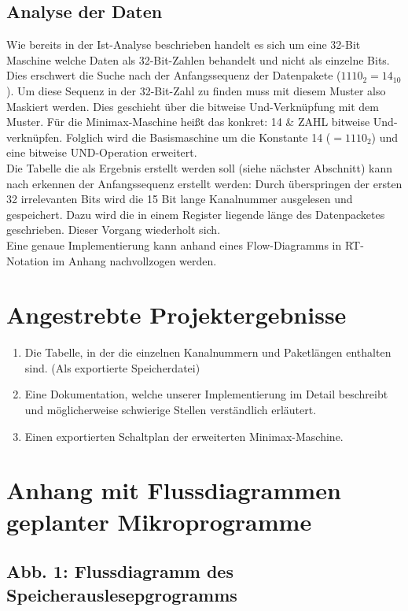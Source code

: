 \documentclass[12pt,titlepage]{article}
\begin{document}
\subsection{Analyse der Daten}


Wie bereits in der Ist-Analyse beschrieben handelt es sich um eine 32-Bit Maschine welche Daten als 32-Bit-Zahlen behandelt und nicht als 
einzelne Bits. Dies erschwert die Suche nach der Anfangssequenz der Datenpakete ($1110_{2} = 14_{10}$). Um diese Sequenz in der 32-Bit-Zahl
zu finden muss mit diesem Muster also Maskiert werden. Dies geschieht {\"u}ber die bitweise Und-Verkn{\"u}pfung mit dem Muster. F{\"u}r die Minimax-Maschine
heißt das konkret: 14 \& ZAHL bitweise Und-verkn{\"u}pfen. Folglich wird die Basismaschine um die Konstante 14 ($=1110_{2}$) und eine bitweise UND-Operation
erweitert.\\
Die Tabelle die als Ergebnis erstellt werden soll (siehe n{\"a}chster Abschnitt) kann nach erkennen der Anfangssequenz erstellt werden:
Durch {\"u}berspringen der ersten 32 irrelevanten Bits wird die 15 Bit lange Kanalnummer ausgelesen und gespeichert. Dazu wird die in einem Register liegende l{\"a}nge des Datenpacketes geschrieben. Dieser Vorgang wiederholt sich.\\
Eine genaue Implementierung kann anhand eines Flow-Diagramms in RT-Notation im Anhang nachvollzogen werden.


\section{Angestrebte Projektergebnisse}
\begin{enumerate}
\item Die Tabelle, in der die einzelnen Kanalnummern und Paketl{\"a}ngen enthalten sind. (Als exportierte Speicherdatei)
\item Eine Dokumentation, welche unserer Implementierung im Detail beschreibt und m{\"o}glicherweise schwierige Stellen verst{\"a}ndlich erl{\"a}utert.
\item Einen exportierten Schaltplan der erweiterten Minimax-Maschine.
\end{enumerate}

\section{Anhang mit Flussdiagrammen \\ geplanter Mikroprogramme}

\subsection{Abb. 1: Flussdiagramm des Speicherauslesepgrogramms}
\end{document}
